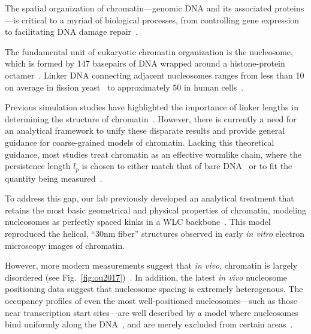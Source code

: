 \documentclass[%
 reprint,
superscriptaddress,
showpacs,preprintnumbers,
 amsmath,amssymb,
 aps,
 prl,
]{revtex4-1}
\begin{document}

The spatial organization of chromatin---genomic DNA and its associated proteins---is critical
    to a myriad of biological processes, from controlling gene expression~\cite{hubner2013}
    to facilitating DNA damage repair~\cite{hauer2017,stadler2017}.

The fundamental unit of eukaryotic chromatin organization is the
    nucleosome, which is formed by 147 basepairs of DNA wrapped around a histone-protein
    octamer~\cite{cutter2015a}.
Linker DNA connecting adjacent nucleosomes ranges from less than \SI{10}{\basepair} on
    average in fission yeast~\cite{givens2012} to approximately {\SI{50}{\basepair}} in human
    cells~\cite{schones2008}.

Previous simulation studies have highlighted the importance of linker lengths
    in determining the structure of chromatin~\cite{%
    bascom2017a,collepardo-guevara2014,bascom2018,grigoryev2016,kepper2008,
    koslover2010,langowski2007,muller2014,schiessel2001,scipioni2010,wedemann2002,
    woodcock1993}.
However, there is currently a need for an analytical framework to unify these
    disparate results and provide general guidance for coarse-grained models of
    chromatin.
Lacking this theoretical guidance, most studies treat chromatin as an effective
    wormlike chain, where the persistence length $l_p$ is chosen to either
    match that of bare DNA~\cite{benedetti2017, macpherson2018,nuebler2018} or
    to fit the quantity being measured~\cite{sanborn2015,pierro2017}.

To address this gap, our lab previously developed an analytical treatment that
    retains the most basic geometrical and physical properties of chromatin,
    modeling nucleosomes as perfectly spaced kinks in a WLC
    backbone~\cite{koslover2013a}.
This model reproduced the helical, ``30nm fiber'' structures observed in early
    \textit{in vitro} electron microscopy images of chromatin.

However, more modern measurements suggest that \textit{in vivo}, chromatin is largely
    disordered (see Fig.~\ref{fig:ou2017})~\cite{ou2017}.
In addition, the latest \textit{in vivo} nucleosome positioning data suggest that nucleosome
    spacing is extremely heterogenous.
The occupancy profiles of even the most well-positioned nucleosomes---such as those near
    transcription start sites---are well described by a model where nucleosomes bind
    uniformly along the DNA~\cite{kornberg1988, chevereau2009, chereji2011,
    beshnova2014, chou2007, kornberg1981, mavrich2008, mobius2010, mobius2013,
    teif2010, tesoro2016%
    }, and are merely excluded from certain areas~\cite{ozonov2013}.
\end{document}

